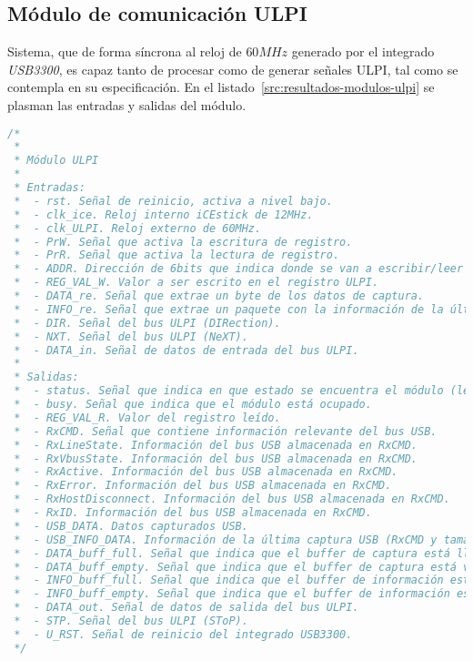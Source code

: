 \subsection{Módulo de comunicación ULPI}
Sistema, que de forma síncrona al reloj de $60MHz$ generado por el integrado \emph{USB3300}, es capaz tanto de procesar como de generar señales ULPI, tal como se contempla en su especificación\cite{ulpi-specs}. En el listado~\ref{src:resultados-modulos-ulpi} se plasman las entradas y salidas del módulo.

\begin{lstlisting}[language=Verilog,
    caption={Entradas y salidas del módulo ULPI.},
    label=src:resultados-modulos-ulpi]
/*
 *
 * Módulo ULPI
 *
 * Entradas:
 *  - rst. Señal de reinicio, activa a nivel bajo.
 *  - clk_ice. Reloj interno iCEstick de 12MHz.
 *  - clk_ULPI. Reloj externo de 60MHz.
 *  - PrW. Señal que activa la escritura de registro.
 *  - PrR. Señal que activa la lectura de registro.
 *  - ADDR. Dirección de 6bits que indica donde se van a escribir/leer los datos.
 *  - REG_VAL_W. Valor a ser escrito en el registro ULPI.
 *  - DATA_re. Señal que extrae un byte de los datos de captura.
 *  - INFO_re. Señal que extrae un paquete con la información de la última captura.
 *  - DIR. Señal del bus ULPI (DIRection).
 *  - NXT. Señal del bus ULPI (NeXT).
 *  - DATA_in. Señal de datos de entrada del bus ULPI.
 *
 * Salidas:
 *  - status. Señal que indica en que estado se encuentra el módulo (lectura, escritura, etc..)
 *  - busy. Señal que indica que el módulo está ocupado.
 *  - REG_VAL_R. Valor del registro leído.
 *  - RxCMD. Señal que contiene información relevante del bus USB.
 *  - RxLineState. Información del bus USB almacenada en RxCMD.
 *  - RxVbusState. Información del bus USB almacenada en RxCMD.
 *  - RxActive. Información del bus USB almacenada en RxCMD.
 *  - RxError. Información del bus USB almacenada en RxCMD.
 *  - RxHostDisconnect. Información del bus USB almacenada en RxCMD.
 *  - RxID. Información del bus USB almacenada en RxCMD.
 *  - USB_DATA. Datos capturados USB.
 *  - USB_INFO_DATA. Información de la última captura USB (RxCMD y tamaño).
 *  - DATA_buff_full. Señal que indica que el buffer de captura está lleno.
 *  - DATA_buff_empty. Señal que indica que el buffer de captura está vacio.
 *  - INFO_buff_full. Señal que indica que el buffer de información está lleno.
 *  - INFO_buff_empty. Señal que indica que el buffer de información está vacio.
 *  - DATA_out. Señal de datos de salida del bus ULPI.
 *  - STP. Señal del bus ULPI (SToP).
 *  - U_RST. Señal de reinicio del integrado USB3300.
 */
\end{lstlisting}

